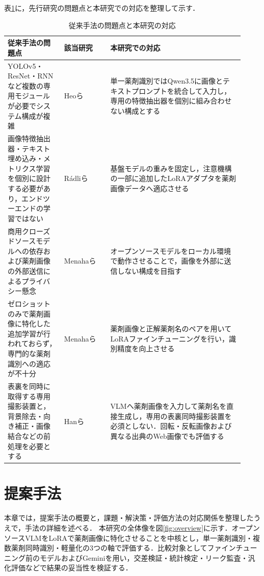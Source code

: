 \documentclass[dvipdfmx]{jsarticle}
\begin{document}
表\ref{tab:related}に，先行研究の問題点と本研究での対応を整理して示す．

\begin{table}[h]
\centering
\caption{従来手法の問題点と本研究の対応}
\label{tab:related}
\small
\setlength{\tabcolsep}{4pt}
\begin{tabular}{p{0.22\linewidth}p{0.18\linewidth}p{0.52\linewidth}}
\hline
従来手法の問題点 & 該当研究 & 本研究での対応 \\
\hline
YOLOv5・ResNet・RNNなど複数の専用モジュールが必要でシステム構成が複雑 &
Heoら \cite{heo2023pill} &
単一薬剤識別ではQwen3.5に画像とテキストプロンプトを統合して入力し，専用の特徴抽出器を個別に組み合わせない構成とする \\
\hline
画像特徴抽出器・テキスト埋め込み・メトリクス学習を個別に設計する必要があり，エンドツーエンドの学習ではない &
Rádliら \cite{radli2024metric} &
基盤モデルの重みを固定し，注意機構の一部に追加したLoRAアダプタを薬剤画像データへ適応させる \\
\hline
商用クローズドソースモデルへの依存および薬剤画像の外部送信によるプライバシー懸念 &
Menahaら \cite{gemini2024pill} &
オープンソースモデルをローカル環境で動作させることで，画像を外部に送信しない構成を目指す \\
\hline
ゼロショットのみで薬剤画像に特化した追加学習が行われておらず，専門的な薬剤識別への適応が不十分 &
Menahaら \cite{gemini2024pill} &
薬剤画像と正解薬剤名のペアを用いてLoRAファインチューニングを行い，識別精度を向上させる \\
\hline
表裏を同時に取得する専用撮影装置と，背景除去・向き補正・画像結合などの前処理を必要とする &
Hanら \cite{han2021bpis} &
VLMへ薬剤画像を入力して薬剤名を直接生成し，専用の表裏同時撮影装置を必須としない．回転・反転画像および異なる出典のWeb画像でも評価する \\
\hline
\end{tabular}
\end{table}

\newpage

\section{提案手法}\label{sec3}

本章では，提案手法の概要と，課題・解決策・評価方法の対応関係を整理したうえで，手法の詳細を述べる．
本研究の全体像を図\ref{fig:overview}に示す．オープンソースVLMをLoRAで薬剤画像に特化させることを中核とし，単一薬剤識別・複数薬剤同時識別・軽量化の3つの軸で評価する．比較対象としてファインチューニング前のモデルおよびGeminiを用い，交差検証・統計検定・リーク監査・汎化評価などで結果の妥当性を検証する．
\end{document}
